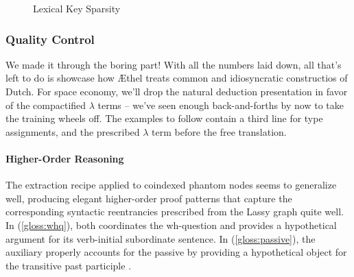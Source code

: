 \begin{figure}
	\centering
	\caption{Lexical Key Sparsity}
	\label{figure:entry_sparsity}
\end{figure}

\pagebreak

\subsubsection{Quality Control}
We made it through the boring part!
With all the numbers laid down, all that's left to do is showcase how \AE thel treats common and idiosyncratic constructios of Dutch.
For space economy, we'll drop the natural deduction presentation in favor of the compactified $\lambda$ terms -- we've seen enough back-and-forths by now to take the training wheels off.
The examples to follow contain a third line for type assignments, and the prescribed $\lambda$ term before the free translation.

\paragraph{Higher-Order Reasoning}
The extraction recipe applied to coindexed phantom nodes seems to generalize well, producing elegant higher-order proof patterns that capture the corresponding syntactic reentrancies prescribed from the Lassy graph quite well.
In (\ref{gloss:whq}),  both coordinates the wh-question and provides a hypothetical argument for its verb-initial subordinate sentence.
In (\ref{gloss:passive}), the auxiliary  properly accounts for the passive by providing a hypothetical object for the transitive past participle .

